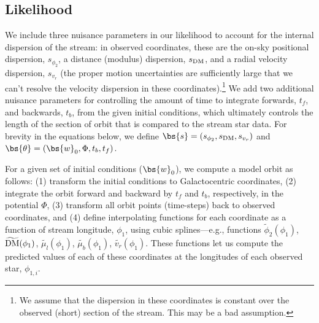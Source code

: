 \documentclass[numberedappendix]{emulateapj}
\newcommand{\DM}{{\rm DM}}
\begin{document}
\subsection{Likelihood}

We include three nuisance parameters in our likelihood to account for the internal dispersion of the stream: in observed coordinates, these are the on-sky positional dispersion, $s_{\phi_2}$, a distance (modulus) dispersion, $s_{\DM}$, and a radial velocity dispersion, $s_{v_r}$ (the proper motion uncertainties are sufficiently large that we can't resolve the velocity dispersion in these coordinates).\footnote{We assume that the dispersion in these coordinates is constant over the observed (short) section of the stream. This may be a bad assumption.} We add two additional nuisance parameters for controlling the amount of time to integrate forwards, $t_f$, and backwards, $t_b$, from the given initial conditions, which ultimately controls the length of the section of orbit that is compared to the stream star data. For brevity in the equations below, we define $\bs{s} = (s_{\phi_2}, s_{\DM}, s_{v_r})$ and $\bs{\theta} = (\bs{w}_0, \Phi, t_b, t_f)$.

For a given set of initial conditions ($\bs{w}_0$), we compute a model orbit as follows: (1) transform the initial conditions to Galactocentric coordinates, (2) integrate the orbit forward and backward by $t_f$ and $t_b$, respectively, in the potential $\Phi$, (3) transform all orbit points (time-steps) back to observed coordinates, and (4) define interpolating functions for each coordinate as a function of stream longitude, $\phi_1$, using cubic splines---e.g., functions $\widetilde{\phi}_{2}(\phi_1)$, $\widetilde{\DM}(\phi_1)$, $\widetilde{\mu_l}(\phi_1)$, $\widetilde{\mu_b}(\phi_1)$, $\widetilde{v_r}(\phi_1)$. These functions let us compute the predicted values of each of these coordinates at the longitudes of each observed star, $\phi_{1,i}$.
\end{document}
